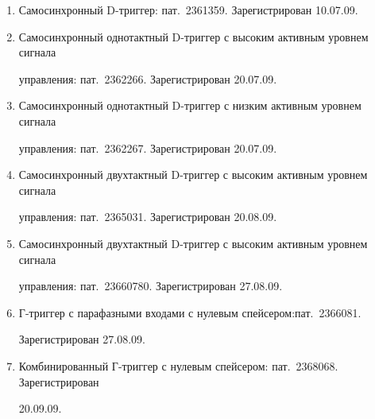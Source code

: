 \begin{enumerate}[1.]


\item {}


Самосинхронный D-триггер: пат.~2361359. Зарегистрирован 10.07.09.





\item {}


Самосинхронный однотактный D-триггер с высоким активным уровнем сигнала 


управления: пат.~2362266. Зарегистрирован 20.07.09.





\item {}


Самосинхронный однотактный D-триггер с низким активным уровнем сигнала 


управления: пат.~2362267. Зарегистрирован 20.07.09.





\item {} 


Самосинхронный двухтактный D-триггер с высоким активным уровнем сигнала 


управ\-ле\-ния: пат.~2365031. Зарегистрирован 20.08.09.





\item {} 


Самосинхронный двухтактный D-триггер с высоким активным уровнем сигнала 


управления: пат.~23660780. Зарегистрирован 27.08.09.





\item {}\linebreak 


Г-триг\-гер с парафазными входами с нулевым спейсером:\linebreak пат.~2366081. 


Зарегистрирован 27.08.09.





\item {} 


Комбинированный Г-триггер с нулевым спейсером: пат.~2368068. Зарегистрирован 


20.09.09.


\end{enumerate}


